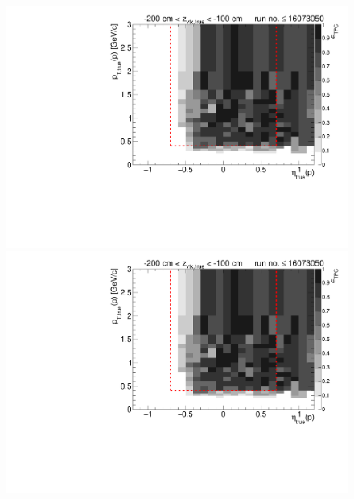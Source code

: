\begin{figure}[hb]
{  \includegraphics[width=\linewidth,page=16]{graphics/eff/Eff2D_TPC_proton_Plus_RunRange1.pdf}\\
  \includegraphics[width=\linewidth,page=18]{graphics/eff/Eff2D_TPC_proton_Plus_RunRange1.pdf}
}%
\end{figure}

